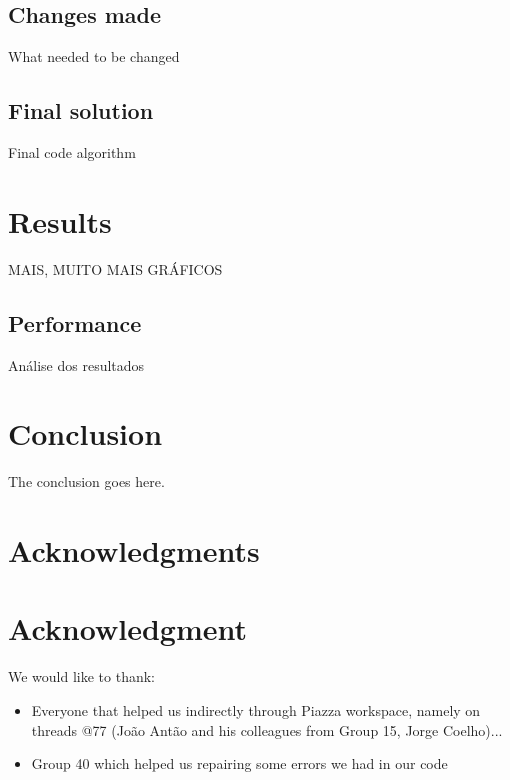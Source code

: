 \documentclass[10pt,journal,compsoc]{IEEEtran}
\begin{document}
\subsection{Changes made}
What needed to be changed

\subsection{Final solution}
Final code algorithm

\section{Results}
MAIS, MUITO MAIS GRÁFICOS

\subsection{Performance}
Análise dos resultados


\section{Conclusion}
The conclusion goes here.


\ifCLASSOPTIONcompsoc
  \section*{Acknowledgments}
\else
  \section*{Acknowledgment}
\fi


We would like to thank:
\begin{itemize}
    \item Everyone that helped us indirectly through Piazza workspace, namely on threads @77 (João Antão and his colleagues from Group 15, Jorge Coelho)...
    \item Group 40 which helped us repairing some errors we had in our code 
\end{itemize}

\ifCLASSOPTIONcaptionsoff
  \newpage
\fi



\end{document}
